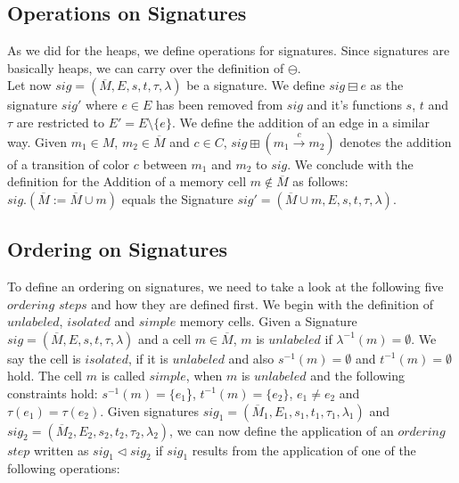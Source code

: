 \subsection{Operations on Signatures}
As we did for the heaps, we define operations for signatures. Since signatures are basically heaps, we
can carry over the definition of $\ominus$.\\
Let now $sig = (\overline{M}, E, s, t, \tau, \lambda)$ be a signature. 
We define $sig \boxminus e$ as the signature $sig'$ where $e \in E$ has been removed from $sig$ and it's functions 
$s$, $t$ and $\tau$ are restricted to $E' = E\setminus\{e\}$. We define the addition of an edge in a similar way.
Given $m_1 \in M$, $m_2 \in \overline{M}$ and $c \in C$, $sig \boxplus (m_1 \xrightarrow{c} m_2)$ denotes the addition
of a transition of color $c$ between $m_1$ and $m_2$ to $sig$. We conclude with the definition for the Addition of
a memory cell $m \not\in \overline{M}$ as follows: $sig.(\overline{M} := \overline{M} \cup {m})$ equals the Signature
$sig' = (\overline{M} \cup {m}, E, s, t, \tau, \lambda)$.

\subsection{Ordering on Signatures}

To define an ordering on signatures, we need to take a look at the following five $ordering$ $steps$ and how they are defined first.
We begin with the definition of $unlabeled$, $isolated$ and $simple$ memory cells.
Given a Signature $sig = (\overline{M}, E, s, t, \tau, \lambda)$ and a cell $m \in \overline{M}$, $m$ is $unlabeled$ if 
$\lambda^{-1}(m) = \emptyset$. We say the cell is $isolated$, if it is $unlabeled$ and also $s^{-1}(m) = \emptyset$ and 
$t^{-1}(m) = \emptyset$ hold. The cell $m$ is called $simple$, when $m$ is $unlabeled$ and the following constraints
hold: $s^{-1}(m) = \{e_1$\}, $t^{-1}(m) = \{e_2\}$, $e_1 \not= e_2$ and $\tau(e_1) = \tau(e_2)$. 
Given signatures $sig_1 = (\overline{M}_1, E_1, s_1, t_1, \tau_1, \lambda_1)$ and
$sig_2 = (\overline{M}_2, E_2, s_2, t_2, \tau_2, \lambda_2)$, we can now define the application of an $ordering$ $step$
written as $sig_1 \vartriangleleft sig_2$ if $sig_1$ results
from the application of one of the following operations:

